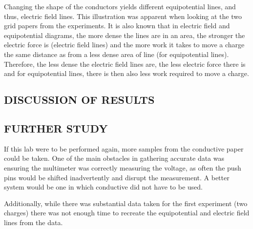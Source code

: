 \documentclass [12pt, letterpaper, twoside] {article}
\begin{document}
Changing the shape of the conductors yields different equipotential lines, and thus, electric field lines. This illustration was apparent when looking at the two grid papers from the experiments.
It is also known that in electric field and equipotential diagrams, the more dense the lines are in an area, the stronger the electric force is (electric field lines) and the more work it takes to move a charge the same distance as from a less dense area of line (for equipotential lines). Therefore, the less dense the electric field lines are, the less electric force there is and for equipotential lines, there is then also less work required to move a charge.

\subsection* {DISCUSSION OF RESULTS}

\subsection* {FURTHER STUDY}
If this lab were to be performed again, more samples from the conductive paper could be taken. One of the main obstacles in gathering accurate data was ensuring the multimeter was correctly measuring the voltage, as often the push pins would be shifted inadvertently and disrupt the measurement. A better system would be one in which conductive did not have to be used.

Additionally, while there was substantial data taken for the first experiment (two charges) there was not enough time to recreate the equipotential and electric field lines from the data.
\end{document}

